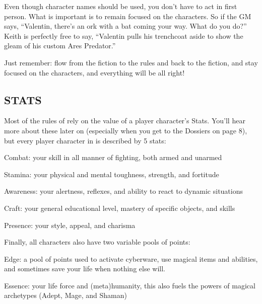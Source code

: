 \documentclass[oneside,10pt]{article}
\begin{document}
\begin{multicols}{2}
Even though character names should be used, you don’t have
to act in first person. What is important is to remain focused
on the characters. So if the GM says, “Valentin, there’s an ork
with a bat coming your way. What do you do?” Keith is perfectly free to say, “Valentin pulls his trenchcoat aside to show
the gleam of his custom Ares Predator.”


Just remember: flow from the fiction to the rules and back to
the fiction, and stay focused on the characters, and everything will be all right!


\subsection{STATS}
Most of the rules of \SW{}  rely on the value of a player
character’s Stats. You’ll hear more about these later on (especially when you get to the Dossiers on page 8), but every
player character in \SW{}  is described by 5
stats:

\vspace{.1cm}

\begin{adjustwidth*}{.5cm}{.5cm}
{\shadowrunbfont Combat:} your skill in all manner of fighting, both armed
and unarmed

{\shadowrunbfont Stamina:} your physical and mental toughness, strength,
and fortitude

{\shadowrunbfont Awareness:} your alertness, reflexes, and ability to react to
dynamic situations

{\shadowrunbfont Craft:} your general educational level, mastery of specific
objects, and skills

{\shadowrunbfont Presence:} your style, appeal, and charisma
\end{adjustwidth*}

Finally, all characters also have two variable
pools of points:

\vspace{.1cm}

\begin{adjustwidth*}{.5cm}{.5cm}

{\shadowrunbfont Edge:} a pool of points used to activate cyberware, use
magical items and abilities, and sometimes save your life when nothing
else will.

{\shadowrunbfont Essence:} your life force and (meta)humanity, this also fuels the powers of magical archetypes (Adept, Mage, and
Shaman)

\vspace{.1cm}
\end{adjustwidth*}


\end{multicols}
\end{document}
